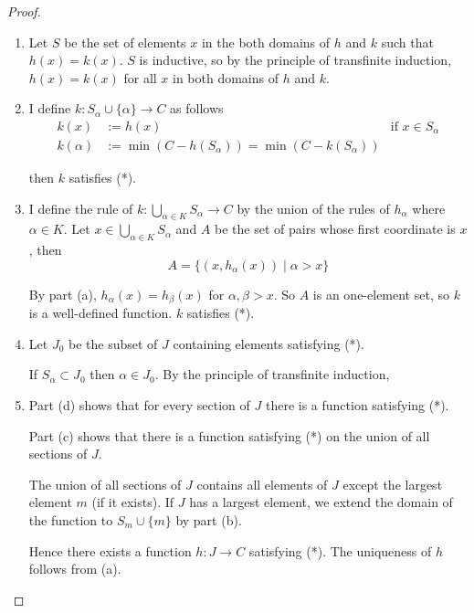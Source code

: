 \begin{proof}
    \begin{enumerate}[label={(\alph*)}]
        \item Let $S$ be the set of elements $x$ in the both domains of $h$ and $k$ such that $h(x) = k(x)$. $S$ is inductive, so by the principle of transfinite induction, $h(x) = k(x)$ for all $x$ in both domains of $h$ and $k$.
        \item I define $k: S_{\alpha}\cup\{\alpha\}\to C$ as follows
              \begin{align*}
                  k(x)      & := h(x)                                              & \text{if $x\in S_{\alpha}$} \\
                  k(\alpha) & := \min(C - h(S_{\alpha})) = \min(C - k(S_{\alpha}))
              \end{align*}

              then $k$ satisfies (*).
        \item I define the rule of $k: \bigcup_{\alpha\in K}S_{\alpha}\to C$ by the union of the rules of $h_{\alpha}$ where $\alpha\in K$. Let $x\in \bigcup_{\alpha\in K}S_{\alpha}$ and $A$ be the set of pairs whose first coordinate is $x$, then
              \[
                  A = \{ (x, h_{\alpha}(x)) \mid \alpha > x \}
              \]

              By part (a), $h_{\alpha}(x) = h_{\beta}(x)$ for $\alpha, \beta > x$. So $A$ is an one-element set, so $k$ is a well-defined function. $k$ satisfies (*).
        \item Let $J_{0}$ be the subset of $J$ containing elements satisfying (*).

              If $S_{\alpha}\subset J_{0}$ then $\alpha\in J_{0}$. By the principle of transfinite induction,
        \item Part (d) shows that for every section of $J$ there is a function satisfying (*).

              Part (c) shows that there is a function satisfying (*) on the union of all sections of $J$.

              The union of all sections of $J$ contains all elements of $J$ except the largest element $m$ (if it exists). If $J$ has a largest element, we extend the domain of the function to $S_{m}\cup \{ m \}$ by part (b).

              Hence there exists a function $h: J\to C$ satisfying (*). The uniqueness of $h$ follows from (a).
    \end{enumerate}
\end{proof}

